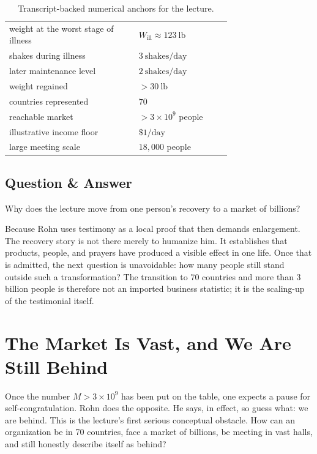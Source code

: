 \begin{table}[h]
\centering
\begin{tabular}{p{0.42\linewidth} p{0.30\linewidth}}
weight at the worst stage of illness & \(W_{\text{ill}} \approx 123\ \text{lb}\) \\
shakes during illness & \(3\ \text{shakes/day}\) \\
later maintenance level & \(2\ \text{shakes/day}\) \\
weight regained & \(>30\ \text{lb}\) \\
countries represented & \(70\) \\
reachable market & \(>3\times 10^9\) people \\
illustrative income floor & \(\$1/\text{day}\) \\
large meeting scale & \(18{,}000\) people
\end{tabular}
\caption{Transcript-backed numerical anchors for the lecture.}
\end{table}

\subsection{Question \& Answer}

Why does the lecture move from one person's recovery to a market of billions?

Because Rohn uses testimony as a local proof that then demands enlargement. The recovery story is not there merely to humanize him. It establishes that products, people, and prayers have produced a visible effect in one life. Once that is admitted, the next question is unavoidable: how many people still stand outside such a transformation? The transition to 70 countries and more than 3 billion people is therefore not an imported business statistic; it is the scaling-up of the testimonial itself.

\section{The Market Is Vast, and We Are Still Behind}

Once the number \(M>3\times 10^9\) has been put on the table, one expects a pause for self-congratulation. Rohn does the opposite. He says, in effect, so guess what: we are behind. This is the lecture's first serious conceptual obstacle. How can an organization be in 70 countries, face a market of billions, be meeting in vast halls, and still honestly describe itself as behind?

